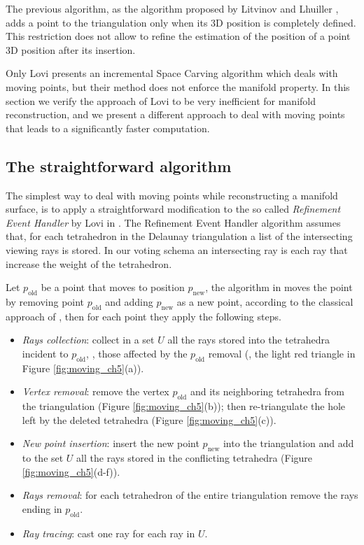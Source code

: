 The previous algorithm, as the algorithm proposed by Litvinov and Lhuiller \cite{litvinov_lhuillier_13}, adds a point to the triangulation only when its 3D position is completely defined. 
This  restriction does not allow to refine the estimation of the position of a point 3D position after its insertion.

Only Lovi \etal \cite{lovi_et_al_11} presents an incremental Space Carving algorithm which deals with moving points, but their method does not enforce the manifold property.
In this section we verify the approach of Lovi \etal \cite{lovi_et_al_11} to be very inefficient for manifold reconstruction, and we present a different approach to deal with moving points that leads to a significantly faster computation.


\subsection{The straightforward algorithm}
\label{subsec:straightforward_way}
The simplest way to deal with moving points while reconstructing a manifold surface, is to apply a straightforward modification to the so called \emph{Refinement Event Handler} by Lovi \etal in \cite{lovi_et_al_11}.
The Refinement Event Handler algorithm assumes that, for each tetrahedron in the Delaunay triangulation a list of the intersecting viewing rays is stored. In our voting schema an intersecting ray is each ray that increase the weight of the tetrahedron. 

Let $p_{\text{old}}$ be a point that moves to position $p_{\text{new}}$, the algorithm in \cite{lovi_et_al_11} moves the point by removing point $p_{\text{old}}$ and adding $p_{\text{new}}$ as a new point, according to the classical approach of \cite{Devillers03}, then for each point they apply the following steps. 
\begin{itemize}
 \item \emph{Rays collection}: collect in a set $U$ all the rays stored into the tetrahedra incident to $p_{\text{old}}$, \ie, those affected by the $p_{\text{old}}$ removal (\eg, the light red triangle in Figure \ref{fig:moving_ch5}(a)).
 \item \emph{Vertex removal}: remove the vertex $p_{\text{old}}$ and its neighboring tetrahedra from the triangulation (Figure \ref{fig:moving_ch5}(b)); then re-triangulate the hole left by the deleted tetrahedra (Figure \ref{fig:moving_ch5}(c)).
 \item \emph{New point insertion}: insert the new point $p_{\text{new}}$ into the triangulation and add to the set $U$ all the rays stored in the conflicting tetrahedra (Figure \ref{fig:moving_ch5}(d-f)).
 \item  \emph{Rays removal}: for each tetrahedron of the entire triangulation remove the rays ending in $p_{\text{old}}$. 
 \item \emph{Ray tracing}: cast one ray for each ray in $U$.
\end{itemize}



